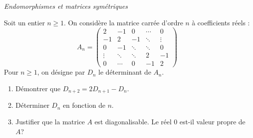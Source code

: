 \documentclass[a4paper,10pt]{report}
\begin{document}
\medskip

\begin{center}
\textit{{ {\large Endomorphismes et matrices symétriques}}}
\end{center}

\medskip

\begin{Exercice}{} Soit un entier $n\geq 1.$ On consid\`{e}re la matrice carr\'{e}e d'ordre $n$ \`{a} coefficients r\'{e}els :
\begin{equation*}
A_n=\begin{pmatrix}
2 & -1 & 0 & \cdots & 0 \\ 
-1 & 2 & -1 & \ddots & \vdots \\ 
0 & -1 & \ddots & \ddots & 0 \\ 
\vdots & \ddots & \ddots & 2 & -1 \\ 
0 & \cdots & 0 & -1 & 2
\end{pmatrix}
\end{equation*}
Pour $n\geq 1$, on d\'{e}signe par $D_{n}$ le d\'{e}terminant de $A_n$.
\begin{enumerate}
\item Démontrer que $D_{n+2}=2D_{n+1}-D_{n}$.
\item D\'{e}terminer $D_{n}$ en fonction de $n$.
\item Justifier que la matrice $A$ est diagonalisable. Le r\'{e}el $0$ est-il valeur propre de $A$?
\end{enumerate}
\end{Exercice}

\end{document}
